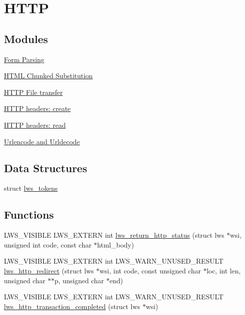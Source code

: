 \hypertarget{group__http}{}\section{H\+T\+TP}
\label{group__http}
\subsection*{Modules}
\begin{DoxyCompactItemize}
\item 
\hyperlink{group__form-parsing}{Form Parsing}
\item 
\hyperlink{group__html-chunked-substitution}{H\+T\+M\+L Chunked Substitution}
\item 
\hyperlink{group__httpft}{H\+T\+T\+P File transfer}
\item 
\hyperlink{group__HTTP-headers-create}{H\+T\+T\+P headers\+: create}
\item 
\hyperlink{group__HTTP-headers-read}{H\+T\+T\+P headers\+: read}
\item 
\hyperlink{group__urlendec}{Urlencode and Urldecode}
\end{DoxyCompactItemize}
\subsection*{Data Structures}
\begin{DoxyCompactItemize}
\item 
struct \hyperlink{structlws__tokens}{lws\+\_\+tokens}
\end{DoxyCompactItemize}
\subsection*{Functions}
\begin{DoxyCompactItemize}
\item 
L\+W\+S\+\_\+\+V\+I\+S\+I\+B\+LE L\+W\+S\+\_\+\+E\+X\+T\+E\+RN int \hyperlink{group__http_gac8a4a71240857dc6b2ed70456b6923f4}{lws\+\_\+return\+\_\+http\+\_\+status} (struct lws $\ast$wsi, unsigned int code, const char $\ast$html\+\_\+body)
\item 
L\+W\+S\+\_\+\+V\+I\+S\+I\+B\+LE L\+W\+S\+\_\+\+E\+X\+T\+E\+RN int L\+W\+S\+\_\+\+W\+A\+R\+N\+\_\+\+U\+N\+U\+S\+E\+D\+\_\+\+R\+E\+S\+U\+LT \hyperlink{group__http_ga8fbf01e473ac421fc33ad9f8da8b8a25}{lws\+\_\+http\+\_\+redirect} (struct lws $\ast$wsi, int code, const unsigned char $\ast$loc, int len, unsigned char $\ast$$\ast$p, unsigned char $\ast$end)
\item 
L\+W\+S\+\_\+\+V\+I\+S\+I\+B\+LE L\+W\+S\+\_\+\+E\+X\+T\+E\+RN int L\+W\+S\+\_\+\+W\+A\+R\+N\+\_\+\+U\+N\+U\+S\+E\+D\+\_\+\+R\+E\+S\+U\+LT \hyperlink{group__http_gad27aed6c66a41b2b89ffe4da2a309e8a}{lws\+\_\+http\+\_\+transaction\+\_\+completed} (struct lws $\ast$wsi)
\end{DoxyCompactItemize}


